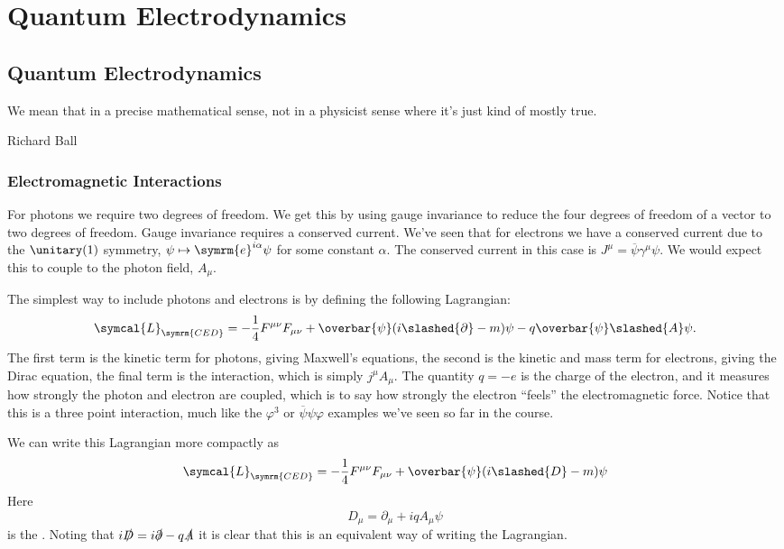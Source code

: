\documentclass[fleqn]{NotesClass}
\newcommand{\e}{\symrm{e}}
\newcommand{\lagrangianDensity}{\symcal{L}}
\newcommand{\diracadjoint}[1]{\overbar{#1}}
\newcommand{\covariantDerivative}{D}
\begin{document}
    \part{Quantum Electrodynamics}
    \chapter{Quantum Electrodynamics}
    \epigraph{We mean that in a precise mathematical sense, not in a physicist sense where it's just kind of mostly true.}{Richard Ball}
    \section{Electromagnetic Interactions}
    For photons we require two degrees of freedom.
    We get this by using gauge invariance to reduce the four degrees of freedom of a vector to two degrees of freedom.
    Gauge invariance requires a conserved current.
    We've seen that for electrons we have a conserved current due to the \(\unitary(1)\) symmetry, \(\psi \mapsto \e^{i\alpha}\psi\) for some constant \(\alpha\).
    The conserved current in this case is \(J^\mu = \diracadjoint{\psi}\gamma^\mu\psi\).
    We would expect this to couple to the photon field, \(A_\mu\).
    
    The simplest way to include photons and electrons is by defining the following Lagrangian:
    \begin{equation}
        \lagrangianDensity_{\symrm{CED}} = -\frac{1}{4} F^{\mu\nu}F_{\mu\nu} + \diracadjoint{\psi}(i \slashed{\partial} - m) \psi - q \diracadjoint{\psi} \slashed{A} \psi.
    \end{equation}
    The first term is the kinetic term for photons, giving Maxwell's equations, the second is the kinetic and mass term for electrons, giving the Dirac equation, the final term is the interaction, which is simply \(j^\mu A_\mu\).
    The quantity \(q = -e\) is the charge of the electron, and it measures how strongly the photon and electron are coupled, which is to say how strongly the electron \enquote{feels} the electromagnetic force.
    Notice that this is a three point interaction, much like the \(\varphi^3\) or \(\diracadjoint{\psi}\psi\varphi\) examples we've seen so far in the course.
    
    We can write this Lagrangian more compactly as
    \begin{equation}
        \lagrangianDensity_{\symrm{CED}} = -\frac{1}{4}F^{\mu\nu}F_{\mu\nu} + \diracadjoint{\psi}(i\slashed{\covariantDerivative} - m)\psi
    \end{equation}
    Here
    \begin{equation}
        \covariantDerivative_\mu = \partial_\mu +iqA_\mu \psi
    \end{equation}
    is the .
    Noting that \(i\slashed{\covariantDerivative} = i\slashed{\partial} - q\slashed{A}\) it is clear that this is an equivalent way of writing the Lagrangian.
    
\end{document}
